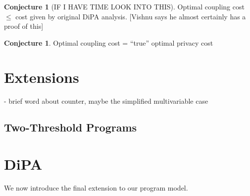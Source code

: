 \documentclass[12pt]{article}
\theoremstyle{definition}
\newtheorem{conj}[thm]{Conjecture}
\begin{document}
\begin{conj}[IF I HAVE TIME LOOK INTO THIS]
    Optimal coupling cost $\leq$ cost given by original DiPA analysis. [Vishnu says he almost certainly has a proof of this]
\end{conj}

\begin{conj}
    Optimal coupling cost = ``true'' optimal privacy cost
\end{conj}


\section{Extensions}

- brief word about counter, maybe the simplified multivariable case

\subsection{Two-Threshold Programs}

\noindent\hrulefill

\section{DiPA}

We now introduce the final extension to our program model. 
\end{document}
